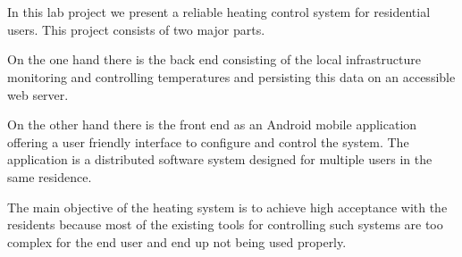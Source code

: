 
\chapter*{\abstractname}
\label{chap:abstract}

In this lab project we present a reliable heating control system for residential users.
This project consists of two major parts.

On the one hand there is the back end consisting of the local infrastructure monitoring and controlling temperatures and persisting this data on an accessible web server.

On the other hand there is the front end as an Android mobile application offering a user friendly interface to configure and control the system. The application is a distributed software system designed for multiple users in the same residence.

The main objective of the heating system is to achieve high acceptance with the residents because most of the existing tools for controlling such systems are too complex for the end user and end up not being used properly.